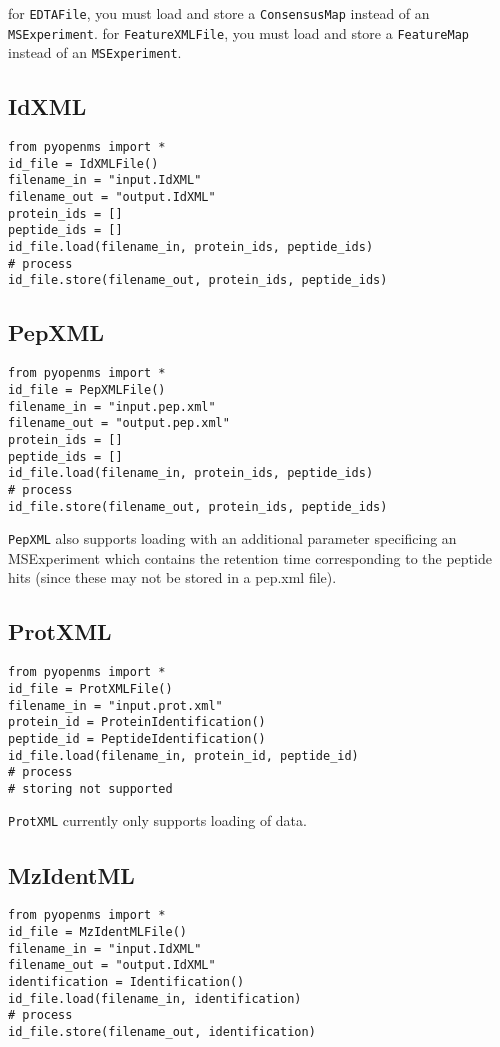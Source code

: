 \documentclass[10pt]{article}
\begin{document}
for \texttt{EDTAFile}, you must load and store a \texttt{ConsensusMap} instead
of an \texttt{MSExperiment}.
for \texttt{FeatureXMLFile}, you must load and store a \texttt{FeatureMap} instead
of an \texttt{MSExperiment}.


\subsection{IdXML}
\begin{verbatim}
from pyopenms import *
id_file = IdXMLFile() 
filename_in = "input.IdXML"
filename_out = "output.IdXML"
protein_ids = []
peptide_ids = []
id_file.load(filename_in, protein_ids, peptide_ids)
# process 
id_file.store(filename_out, protein_ids, peptide_ids)
\end{verbatim}

\subsection{PepXML}
\begin{verbatim}
from pyopenms import *
id_file = PepXMLFile() 
filename_in = "input.pep.xml"
filename_out = "output.pep.xml"
protein_ids = []
peptide_ids = []
id_file.load(filename_in, protein_ids, peptide_ids)
# process 
id_file.store(filename_out, protein_ids, peptide_ids)
\end{verbatim}

\texttt{PepXML} also supports loading with an additional parameter specificing
an MSExperiment which contains the retention time corresponding to the peptide
hits (since these may not be stored in a pep.xml file).

\subsection{ProtXML}
\begin{verbatim}
from pyopenms import *
id_file = ProtXMLFile() 
filename_in = "input.prot.xml"
protein_id = ProteinIdentification()
peptide_id = PeptideIdentification()
id_file.load(filename_in, protein_id, peptide_id)
# process 
# storing not supported
\end{verbatim}

\texttt{ProtXML} currently only supports loading of data.

\subsection{MzIdentML}
\begin{verbatim}
from pyopenms import *
id_file = MzIdentMLFile() 
filename_in = "input.IdXML"
filename_out = "output.IdXML"
identification = Identification()
id_file.load(filename_in, identification)
# process 
id_file.store(filename_out, identification)
\end{verbatim}
\end{document}
